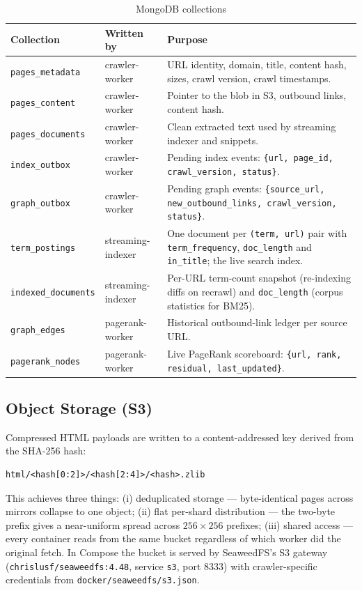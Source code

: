 \documentclass[11pt,a4paper]{article}
\newcommand{\code}[1]{\texttt{#1}}
\begin{document}
\begin{table}[H]
\centering
\caption{MongoDB collections}
\begin{tabular}{p{}p{}p{}}
\toprule
Collection & Written by & Purpose \\
\midrule
\code{pages\_metadata} & crawler-worker & URL identity, domain, title, content hash, sizes, crawl version, crawl timestamps.\\
\code{pages\_content} & crawler-worker & Pointer to the blob in S3, outbound links, content hash.\\
\code{pages\_documents} & crawler-worker & Clean extracted text used by streaming indexer and snippets.\\
\code{index\_outbox} & crawler-worker & Pending index events: \code{\{url, page\_id, crawl\_version, status\}}.\\
\code{graph\_outbox} & crawler-worker & Pending graph events: \code{\{source\_url, new\_outbound\_links, crawl\_version, status\}}.\\
\code{term\_postings} & streaming-indexer & One document per \code{(term, url)} pair with \code{term\_frequency}, \code{doc\_length} and \code{in\_title}; the live search index.\\
\code{indexed\_documents} & streaming-indexer & Per-URL term-count snapshot (re-indexing diffs on recrawl) and \code{doc\_length} (corpus statistics for BM25).\\
\code{graph\_edges} & pagerank-worker & Historical outbound-link ledger per source URL.\\
\code{pagerank\_nodes} & pagerank-worker & Live PageRank scoreboard: \code{\{url, rank, residual, last\_updated\}}.\\
\bottomrule
\end{tabular}
\end{table}

\subsection{Object Storage (S3)}

Compressed HTML payloads are written to a content-addressed key derived from the SHA-256 hash:

\begin{lstlisting}
html/<hash[0:2]>/<hash[2:4]>/<hash>.zlib
\end{lstlisting}

This achieves three things: (i) deduplicated storage --- byte-identical pages across mirrors collapse to one object; (ii) flat per-shard distribution --- the two-byte prefix gives a near-uniform spread across $256 \times 256$ prefixes; (iii) shared access --- every container reads from the same bucket regardless of which worker did the original fetch. In Compose the bucket is served by SeaweedFS's S3 gateway (\code{chrislusf/seaweedfs:4.48}, service \code{s3}, port 8333) with crawler-specific credentials from \code{docker/seaweedfs/s3.json}.
\end{document}

